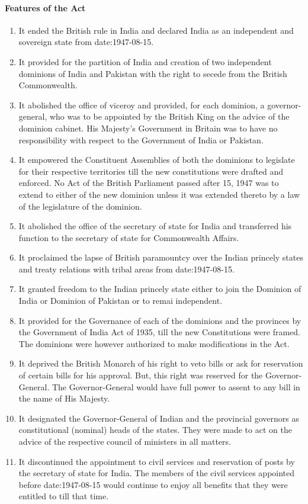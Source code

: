 \paragraph{Features of the Act}
\begin{enumerate}
  \item It ended the British rule in India and declared India as an independent and sovereign state from \gls{date:1947-08-15}.
  \item It provided for the partition of India and creation of two independent dominions of India and Pakistan with the right to secede from the British Commonwealth.
  \item It abolished the office of viceroy and provided, for each dominion, a governor-general, who was to be appointed by the British King on the advice of the dominion cabinet. His Majesty's Government in Britain was to have no responsibility with respect to the Government of India or Pakistan.
  \item It empowered the Constituent Assemblies of both the dominions to legislate for their respective territories till the new constitutions were drafted and enforced. No Act of the British Parliament passed after 15, 1947 was to extend to either of the new dominion unless it was extended thereto by a law of the legislature of the dominion.
  \item It abolished the office of the secretary of state for India and transferred his function to the secretary of state for Commonwealth Affairs.
  \item It proclaimed the lapse of British paramountcy over the Indian princely states and treaty relations with tribal areas from \gls{date:1947-08-15}.
  \item It granted freedom to the Indian princely state either to join the Dominion of India or Dominion of Pakistan or to remai independent.
  \item It provided for the Governance of each of the dominions and the provinces by the Government of India Act of 1935, till the new Constitutions were framed. The dominions were however authorized to make modifications in the Act.
  \item It deprived the British Monarch of his right to veto bills or ask for reservation of certain bills for his approval. But, this right was reserved for the Governor-General. The Governor-General would have full power to assent to any bill in the name of His Majesty.
  \item It designated the Governor-General of Indian and the provincial governors as constitutional (nominal) heads of the states. They were made to act on the advice of the respective council of ministers in all matters.
  \item It discontinued the appointment to civil services and reservation of posts by the secretary of state for India. The members of the civil services appointed before \gls{date:1947-08-15} would continue to enjoy all benefits that they were entitled to till that time.
\end{enumerate}

